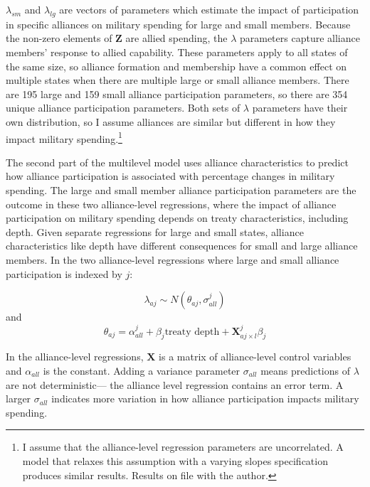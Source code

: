 \documentclass[12pt]{article}
\begin{document}
$\lambda_{sm}$ and $\lambda_{lg}$ are vectors of parameters which estimate the impact of participation in specific alliances on military spending for large and small members. 
Because the non-zero elements of $\textbf{Z}$ are allied spending, the $\lambda$ parameters capture alliance members' response to allied capability. 
These parameters apply to all states of the same size, so alliance formation and membership have a common effect on multiple states when there are multiple large or small alliance members.
There are 195 large and 159 small alliance participation parameters, so there are 354 unique alliance participation parameters. 
Both sets of $\lambda$ parameters have their own distribution, so I assume alliances are similar but different in how they impact military spending.\footnote{I assume that the alliance-level regression parameters are uncorrelated. A model that relaxes this assumption with a varying slopes specification produces similar results. Results on file with the author.}


The second part of the multilevel model uses alliance characteristics to predict how alliance participation is associated with percentage changes in military spending. 
The large and small member alliance participation parameters are the outcome in these two alliance-level regressions, where the impact of alliance participation on military spending depends on treaty characteristics, including depth. 
Given separate regressions for large and small states, alliance characteristics like depth have different consequences for small and large alliance members. 
In the two alliance-level regressions where large and small alliance participation is indexed by $j$:


\begin{equation}
\lambda_{aj} \sim N(\theta_{aj}, \sigma^{j}_{all})
\end{equation} 
and 
\begin{equation}
\theta_{aj} = \alpha^{j}_{all} + \beta_{j} \mbox{treaty depth} + \textbf{X}^{j}_{aj \times l} \beta_{j}
\end{equation}


In the alliance-level regressions, $\textbf{X}$ is a matrix of alliance-level control variables and $\alpha_{all}$ is the constant.
Adding a variance parameter $\sigma_{all}$ means predictions of $\lambda$ are not deterministic--- the alliance level regression contains an error term. 
A larger $\sigma_{all}$ indicates more variation in how alliance participation impacts military spending. 
\end{document}
